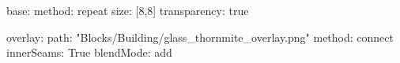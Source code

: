 base:
  method: repeat
  size: [8,8]
  transparency: true

overlay:
  path: "Blocks/Building/glass_thornmite_overlay.png"
  method: connect
  innerSeams: True
blendMode: add